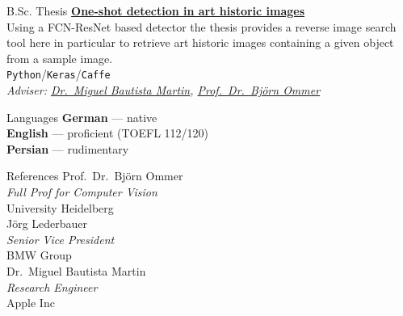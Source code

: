 \documentclass{article}
\newcommand{\slashsep}{\hspace{2mm}/\hspace{2mm}}
\begin{document}
\begin{cvbox}{B.Sc. Thesis}
    \textbf{\href{https://github.com/morris-frank/ba_latex/blob/master/thesis.pdf}{One-shot detection in art historic images}}\\
    Using a FCN-ResNet based detector the thesis provides a reverse image search tool here in particular to retrieve art historic images containing a given object from a sample image.\\
    \texttt{Python}\slashsep\texttt{Keras}\slashsep\texttt{Caffe}\\

    \emph{Adviser: \href{https://scholar.google.com/citations?user=ZrRs-qoAAAAJ}{Dr.\ Miguel Bautista Martin}, \href{https://hci.iwr.uni-heidelberg.de/Staff/bommer}{Prof.\ Dr.\ Björn Ommer}}
\end{cvbox}
\hfill
\begin{cvbox}{Languages}
	\textbf{German} --- native\\
	\textbf{English} --- proficient (TOEFL 112/120)\\
	\textbf{Persian} --- rudimentary
\end{cvbox}
\hfill
\begin{cvbox}{References}
    Prof.\ Dr.\ Björn Ommer\\\emph{Full Prof for Computer Vision}\\University Heidelberg\\

    Jörg Lederbauer\\\emph{Senior Vice President}\\BMW Group\\

    Dr.\ Miguel Bautista Martin\\\emph{Research Engineer}\\Apple Inc
\end{cvbox}
\end{document}
